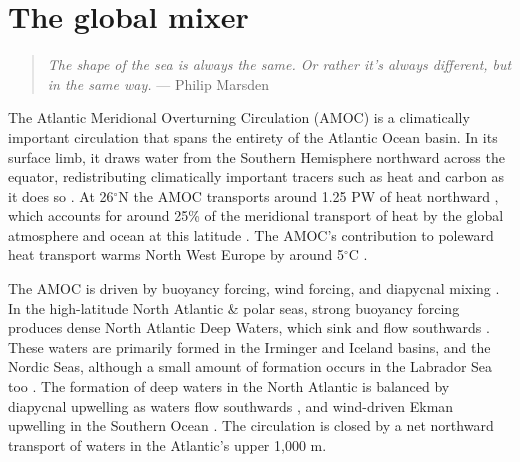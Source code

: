 \chapter{The global mixer}
\label{chap:1}

\begin{quote}
\textit{The shape of the sea is always the same. Or rather it's always different, but in the same way.} --- Philip Marsden
\end{quote}

The Atlantic Meridional Overturning Circulation (AMOC) is a climatically important circulation that spans the entirety of the Atlantic Ocean basin. In its surface limb, it draws water from the Southern Hemisphere northward across the equator, redistributing climatically important tracers such as heat and carbon as it does so \citep{Buckley2015}. At 26$^\circ$N the AMOC transports around 1.25 PW of heat northward \citep{Bryden2020}, which accounts for around 25\% of the meridional transport of heat by the global atmosphere and ocean at this latitude \citep{Srokosz2012}. The AMOC's contribution to poleward heat transport warms North West Europe by around 5$^\circ$C \citep{Jackson2015}.

The AMOC is driven by buoyancy forcing, wind forcing, and diapycnal mixing \citep[e.g.][]{Johnson2019, Munk1998}.
In the high-latitude North Atlantic \& polar seas, strong buoyancy forcing produces dense North Atlantic Deep Waters, which sink and flow southwards \citep[e.g.][]{Marshall1999}. These waters are primarily formed in the Irminger and Iceland basins, and the Nordic Seas, although a small amount of formation occurs in the Labrador Sea too \citep{Lozier2019}. The formation of deep waters in the North Atlantic is balanced by diapycnal upwelling as waters flow southwards \citep{Munk1966, Ferrari2016, Mashayek2017, McDougall2017, Callies2018, Cimoli2022}, and wind-driven Ekman upwelling in the Southern Ocean \citep{Gnanadesikan1999, Marshall2012}. The circulation is closed by a net northward transport of waters in the Atlantic's upper 1,000 m.


